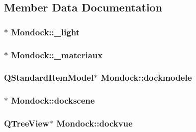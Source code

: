 \subsection{Member Data Documentation}
\hypertarget{class_mondock_a541a241aadaf9820926b427f2d504573}{
\subsubsection[{\+\_\+light}]{$\ast$ Mondock\+::\+\_\+light}}\label{class_mondock_a541a241aadaf9820926b427f2d504573}
\hypertarget{class_mondock_ada15f5ec6dabb8728651472f5cc867a8}{
\subsubsection[{\+\_\+materiaux}]{$\ast$ Mondock\+::\+\_\+materiaux}}\label{class_mondock_ada15f5ec6dabb8728651472f5cc867a8}
\hypertarget{class_mondock_a3f46e1710907a9aedf250fce4ba93076}{
\subsubsection[{dockmodele}]{\setlength{\rightskip}{0pt plus 5cm}Q\+Standard\+Item\+Model$\ast$ Mondock\+::dockmodele}}\label{class_mondock_a3f46e1710907a9aedf250fce4ba93076}
\hypertarget{class_mondock_ac6fd15f2143e05b554f3f936e6f1588f}{
\subsubsection[{dockscene}]{$\ast$ Mondock\+::dockscene}}\label{class_mondock_ac6fd15f2143e05b554f3f936e6f1588f}
\hypertarget{class_mondock_a32e24e3ef7312fbd292740e19c3d3dcd}{
\subsubsection[{dockvue}]{\setlength{\rightskip}{0pt plus 5cm}Q\+Tree\+View$\ast$ Mondock\+::dockvue}}\label{class_mondock_a32e24e3ef7312fbd292740e19c3d3dcd}
